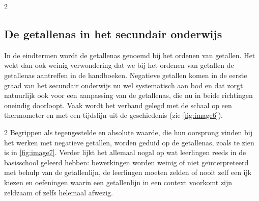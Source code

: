 \begin{multicols}{2}
\subsection{De getallenas in het secundair onderwijs}\label{de-getallenas-in-het-secundair-onderwijs}

In de eindtermen wordt de getallenas genoemd bij het ordenen van getallen.
Het wekt dan ook weinig verwondering dat we bij het ordenen van getallen de getallenas aantreffen in de handboeken.
Negatieve getallen komen in de eerste graad van het secundair onderwijs nu wel systematisch aan bod en dat zorgt natuurlijk ook voor een aanpassing van de getallenas, die nu in beide richtingen oneindig doorloopt.
Vaak wordt het verband gelegd met de schaal op een thermometer en met een tijdslijn uit de geschiedenis (zie \autoref{fig:image6}). 
\end{multicols}
\begin{multicols}{2}
Begrippen als tegengestelde en absolute waarde, die hun oorsprong vinden bij het werken met negatieve getallen, worden geduid op de getallenas, zoals te zien is in \autoref{fig:image7}.
Verder lijkt het allemaal nogal op wat leerlingen reeds in de basisschool geleerd hebben: bewerkingen worden weinig of niet geïnterpreteerd met behulp van de getallenlijn, de leerlingen moeten zelden of nooit zelf een ijk kiezen en oefeningen waarin een getallenlijn in een context voorkomt zijn zeldzaam of zelfs helemaal afwezig. %
\end{multicols}

